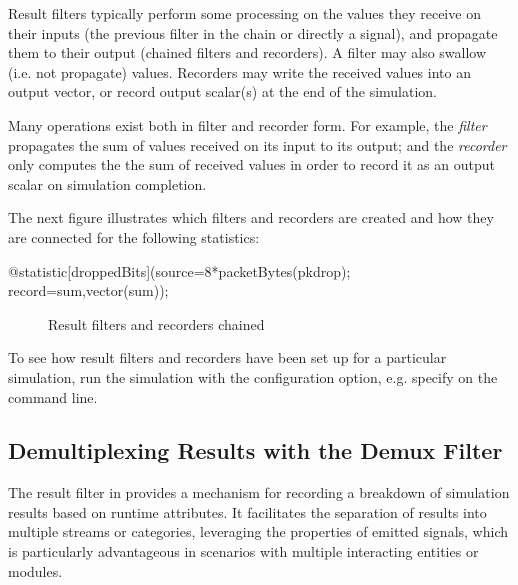 \begin{ned}
Result filters typically perform some processing on the values they receive
on their inputs (the previous filter in the chain or directly a signal),
and propagate them to their output (chained filters and recorders). A
filter may also swallow (i.e. not propagate) values. Recorders may write
the received values into an output vector, or record output scalar(s)
at the end of the simulation.

Many operations exist both in filter and recorder form. For example, the
 \textit{filter} propagates the sum of values received on its
input to its output; and the  \textit{recorder} only computes the
the sum of received values in order to record it as an output scalar on
simulation completion.

The next figure illustrates which filters and recorders are created and how
they are connected for the following statistics:

\begin{ned}
@statistic[droppedBits](source=8*packetBytes(pkdrop); record=sum,vector(sum));
\end{ned}

\begin{figure}[htbp]
  \begin{center}
    
    \caption{Result filters and recorders chained}
  \end{center}
\end{figure}

\begin{hint}
To see how result filters and recorders have been set up for a particular
simulation, run the simulation with the 
configuration option, e.g. specify 
on the command line.
\end{hint}


\subsection{Demultiplexing Results with the Demux Filter}
\label{sec:simple-modules:demux-filter}

The  result filter in {\omnetpp} provides a mechanism for
recording a breakdown of simulation results based on runtime attributes. It
facilitates the separation of results into multiple streams or categories,
leveraging the properties of emitted signals, which is particularly advantageous
in scenarios with multiple interacting entities or modules.


\end{ned}
